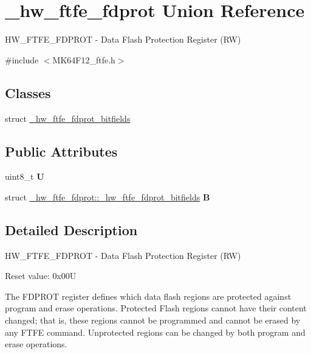 \hypertarget{union__hw__ftfe__fdprot}{}\section{\+\_\+hw\+\_\+ftfe\+\_\+fdprot Union Reference}
\label{union__hw__ftfe__fdprot}


H\+W\+\_\+\+F\+T\+F\+E\+\_\+\+F\+D\+P\+R\+OT -\/ Data Flash Protection Register (RW)  




{\ttfamily \#include $<$M\+K64\+F12\+\_\+ftfe.\+h$>$}

\subsection*{Classes}
\begin{DoxyCompactItemize}
\item 
struct \hyperlink{struct__hw__ftfe__fdprot_1_1__hw__ftfe__fdprot__bitfields}{\+\_\+hw\+\_\+ftfe\+\_\+fdprot\+\_\+bitfields}
\end{DoxyCompactItemize}
\subsection*{Public Attributes}
\begin{DoxyCompactItemize}
\item 
uint8\+\_\+t {\bfseries U}\hypertarget{union__hw__ftfe__fdprot_af3084bd6422e1549f3d0be800d6b0133}{}\label{union__hw__ftfe__fdprot_af3084bd6422e1549f3d0be800d6b0133}

\item 
struct \hyperlink{struct__hw__ftfe__fdprot_1_1__hw__ftfe__fdprot__bitfields}{\+\_\+hw\+\_\+ftfe\+\_\+fdprot\+::\+\_\+hw\+\_\+ftfe\+\_\+fdprot\+\_\+bitfields} {\bfseries B}\hypertarget{union__hw__ftfe__fdprot_a135f74a3a43fbd5031045027c51ee7d2}{}\label{union__hw__ftfe__fdprot_a135f74a3a43fbd5031045027c51ee7d2}

\end{DoxyCompactItemize}


\subsection{Detailed Description}
H\+W\+\_\+\+F\+T\+F\+E\+\_\+\+F\+D\+P\+R\+OT -\/ Data Flash Protection Register (RW) 

Reset value\+: 0x00U

The F\+D\+P\+R\+OT register defines which data flash regions are protected against program and erase operations. Protected Flash regions cannot have their content changed; that is, these regions cannot be programmed and cannot be erased by any F\+T\+FE command. Unprotected regions can be changed by both program and erase operations. 

